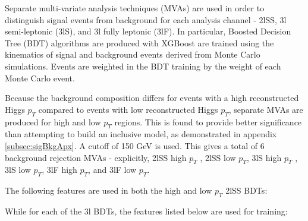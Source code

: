 Separate multi-variate analysis techniques (MVAs) are used in order to distinguish signal events from background for each analysis channel - 2lSS, 3l semi-leptonic (3lS), and 3l fully leptonic (3lF). In particular, Boosted Decision Tree (BDT) algorithms are produced with XGBoost \cite{xgboost} are trained using the kinematics of signal and background events derived from Monte Carlo simulations. Events are weighted in the BDT training by the weight of each Monte Carlo event. 

Because the background composition differs for events with a high reconstructed Higgs $p_T$ compared to events with low reconstructed Higgs $p_T$, separate MVAs are produced for high and low $p_T$ regions. This is found to provide better significance than attempting to build an inclusive model, as demonstrated in appendix \ref{subsec:sigBkgApx}. A cutoff of 150 GeV is used. This gives a total of 6 background rejection MVAs - explicitly, 2lSS high $p_T$ , 2lSS low $p_T$, 3lS high $p_T$ , 3lS low $p_T$, 3lF high $p_T$, and 3lF low $p_T$.

The following features are used in both the high and low $p_T$ 2lSS BDTs:



While for each of the 3l BDTs, the features listed below are used for training:



\begin{figure}[h!]
  \\
  \\
  \\
  \caption{}
  \label{}
\end{figure}

